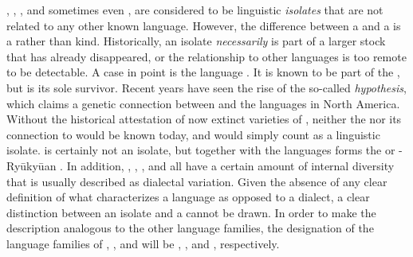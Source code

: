 , , , and sometimes even , are considered to be linguistic \textit{isolates} that are not related to any other known language. However, the difference between a  and a  is a  rather than kind. Historically, an isolate \textit{necessarily} is part of a larger stock that has already disappeared, or the relationship to other languages is too remote to be detectable. A case in point is the language . It is known to be part of the  , but is its sole survivor. Recent years have seen the rise of the so-called \textit{ hypothesis}, which claims a genetic connection between  and the  languages in North America. Without the historical attestation of now extinct varieties of , neither the   nor its connection to  would be known today, and  would simply count as a linguistic isolate.  is certainly not an isolate, but together with the  languages forms the  or -Ryūkyūan . In addition, , , , and  all have a certain amount of internal diversity that is usually described as dialectal variation. Given the absence of any clear definition of what characterizes a language as opposed to a dialect, a clear distinction between an isolate and a  cannot be drawn. In order to make the description analogous to the other language families, the designation of the language families of , , and  will be , , and  \citep{Janhunen1996}, respectively.

